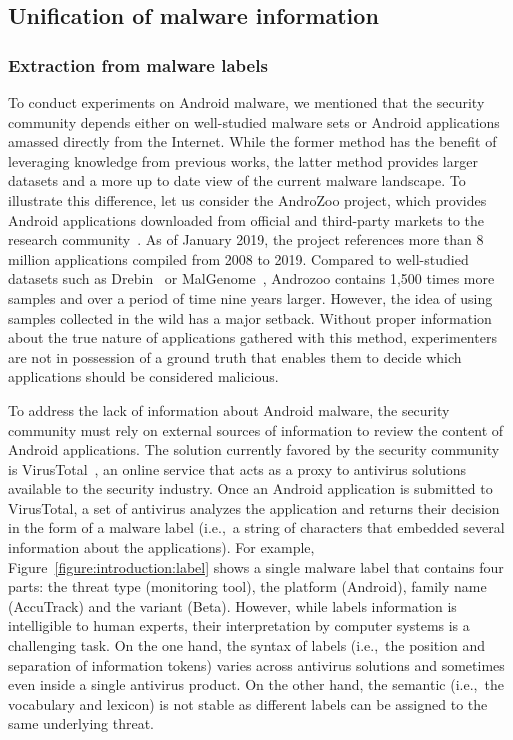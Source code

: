 \subsection{Unification of malware information}
\subsubsection{Extraction from malware labels}
To conduct experiments on Android malware, we mentioned that the security community depends either on well-studied malware sets or Android applications amassed directly from the Internet.
While the former method has the benefit of leveraging knowledge from previous works, the latter method provides larger datasets and a more up to date view of the current malware landscape.
To illustrate this difference, let us consider the AndroZoo project, which provides Android applications downloaded from official and third-party markets to the research community~\cite{allix_androzoo:_2016}.
As of January 2019, the project references more than 8 million applications compiled from 2008 to 2019.
Compared to well-studied datasets such as Drebin~\cite{arp_drebin:_2014} or MalGenome~\cite{zhou_dissecting_2012}, Androzoo contains 1,500 times more samples and over a period of time nine years larger.
However, the idea of using samples collected in the wild has a major setback.
Without proper information about the true nature of applications gathered with this method, experimenters are not in possession of a ground truth that enables them to decide which applications should be considered malicious.

To address the lack of information about Android malware, the security community must rely on external sources of information to review the content of Android applications.
The solution currently favored by the security community is VirusTotal~\cite{noauthor_virustotal_nodate}, an online service that acts as a proxy to antivirus solutions available to the security industry.
Once an Android application is submitted to VirusTotal, a set of antivirus analyzes the application and returns their decision in the form of a malware label (i.e.,\ a string of characters that embedded several information about the applications).
For example, Figure~\ref{figure:introduction:label} shows a single malware label that contains four parts: the threat type (monitoring tool), the platform (Android), family name (AccuTrack) and the variant (Beta).
However, while labels information is intelligible to human experts, their interpretation by computer systems is a challenging task.
On the one hand, the syntax of labels (i.e.,\ the position and separation of information tokens) varies across antivirus solutions and sometimes even inside a single antivirus product.
On the other hand, the semantic (i.e.,\ the vocabulary and lexicon) is not stable as different labels can be assigned to the same underlying threat.

